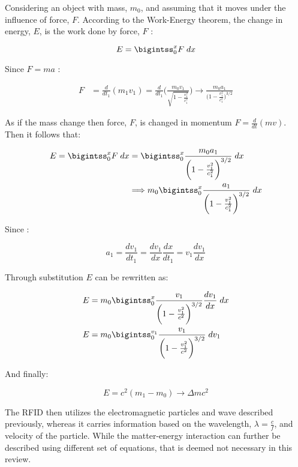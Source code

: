 \documentclass[12pt]{article}
\begin{document}
Considering an object with mass, $m_0$, and assuming that it moves under the influence of force, $F$. According to the Work-Energy theorem, the change in energy, $E$, is the work done by force, $F$ :

\begin{equation}
	E = \bigintss_{0}^{x} F\;dx
\end{equation}

Since $F = ma$ : 

\begin{align*}
	F &= \frac{d}{dt_1} (m_1 v_1) = \frac{d}{dt_1} \Biggr ( \frac{m_0 v_1}{\sqrt{1 - \frac{v^2_1}{c^2_1}}} \Biggr ) \longrightarrow \frac{m_0 a_1}{\Big (1 - \frac{v_1^2}{c_1^2}  \Big )^{3/2}}
\end{align*}

As if the mass change then force, $F$, is changed in momentum $F = \frac{d}{dt}(mv)$. Then it follows that:

\begin{align*}
	E = \bigintss_{0}^{x} F\;dx &= \bigintss_{0}^{x} \frac{m_0 a_1}{\bigg ( 1 - \frac{v_1^2}{c_1^2} \bigg )^{3/2}} \;dx \\
	&\Longrightarrow m_0 \bigintss_{0}^{x} \frac{a_1}{\bigg ( 1 - \frac{v_1^2}{c_1^2} \bigg )^{3/2}}\;dx
\end{align*}

Since :

\begin{equation*}
	a_1 = \frac{dv_1}{dt_1} = \frac{dv_1}{dx} \frac{dx}{dt_1} = v_1 \frac{dv_1}{dx}
\end{equation*}

Through substitution $E$ can be rewritten as:

\begin{align}
	E &= m_0 \bigintss_{0}^{x} \frac{v_1}{\bigg ( 1 - \frac{v_1^2}{c^2} \bigg )^{3/2}} \frac{dv_1}{dx}\;dx \nonumber \\
	E &= m_0 \bigintss_{0}^{v_1} \frac{v_1}{\bigg ( 1 - \frac{v_1^2}{c^2} \bigg )^{3/2}}\;dv_1 \label{d:1}
\end{align}

And finally:

\begin{equation}
	E = c^2 (m_1 - m_0) \longrightarrow \Delta m c^2
\end{equation}

The RFID then utilizes the electromagnetic particles and wave described previously, whereas it carries information based on the wavelength, $\lambda = \frac{c}{f}$, and velocity of the particle. While the matter-energy interaction can further be described using different set of equations, that is deemed not necessary in this review.
\end{document}
